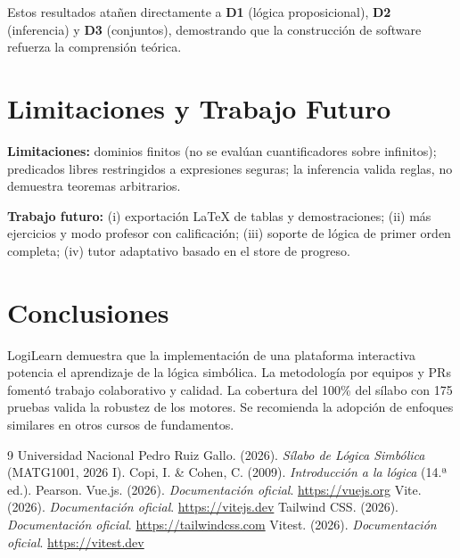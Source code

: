 \documentclass[12pt,a4paper]{article}
\begin{document}
Estos resultados atañen directamente a \textbf{D1} (lógica proposicional), \textbf{D2} (inferencia) y
\textbf{D3} (conjuntos), demostrando que la construcción de software refuerza la comprensión teórica.

\section{Limitaciones y Trabajo Futuro}
\textbf{Limitaciones:} dominios finitos (no se evalúan cuantificadores sobre infinitos); predicados
libres restringidos a expresiones seguras; la inferencia valida reglas, no demuestra teoremas
arbitrarios.

\textbf{Trabajo futuro:} (i) exportación LaTeX de tablas y demostraciones; (ii) más ejercicios y modo
profesor con calificación; (iii) soporte de lógica de primer orden completa; (iv) tutor adaptativo
basado en el store de progreso.

\section{Conclusiones}
LogiLearn demuestra que la implementación de una plataforma interactiva potencia el aprendizaje de la
lógica simbólica. La metodología por equipos y PRs fomentó trabajo colaborativo y calidad. La
cobertura del 100\% del sílabo con 175 pruebas valida la robustez de los motores. Se recomienda la
adopción de enfoques similares en otros cursos de fundamentos.

\begin{thebibliography}{9}
 Universidad Nacional Pedro Ruiz Gallo. (2026). \textit{Sílabo de Lógica Simbólica} (MATG1001, 2026 I).
 Copi, I. \& Cohen, C. (2009). \textit{Introducción a la lógica} (14.ª ed.). Pearson.
 Vue.js. (2026). \textit{Documentación oficial}. \url{https://vuejs.org}
 Vite. (2026). \textit{Documentación oficial}. \url{https://vitejs.dev}
 Tailwind CSS. (2026). \textit{Documentación oficial}. \url{https://tailwindcss.com}
 Vitest. (2026). \textit{Documentación oficial}. \url{https://vitest.dev}
\end{thebibliography}
\end{document}
